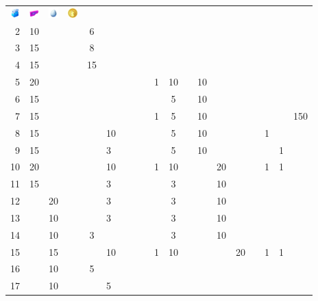 \begin{table}[t]
\begin{center}
\begin{tabular}{r g c g c g c g c g c g c g c g c g c}
  \includegraphics[width=1em]{images/Max_Potion.png} &
  \includegraphics[width=1em]{images/lure.png} &
  \includegraphics[width=1em]{images/luckyegg.png} &
  \includegraphics[width=1em]{images/pokecoin.png}
    \\
    2 & 10 &    &    &  6 &    & & & &   &    &    &    &    &    &   &   &   & \\
    3 & 15 &    &    &  8 &    & & & &   &    &    &    &    &    &   &   &   & \\
    4 & 15 &    &    & 15 &    & & & &   &    &    &    &    &    &   &   &   & \\
    5 & 20 &    &    &    &    & & & & 1 & 10 &    & 10 &    &    &   &   &   & \\
    6 & 15 &    &    &    &    & & & &   &  5 &    & 10 &    &    &   &   &   & \\
    7 & 15 &    &    &    &    & & & & 1 &  5 &    & 10 &    &    &   &   &   & 150 \\
    8 & 15 &    &    &    & 10 & & & &   &  5 &    & 10 &    &    &   & 1 &   & \\
    9 & 15 &    &    &    &  3 & & & &   &  5 &    & 10 &    &    &   &   & 1 & \\
   10 & 20 &    &    &    & 10 & & & & 1 & 10 &    &    & 20 &    &   & 1 & 1 & \\
   11 & 15 &    &    &    &  3 & & & &   &  3 &    &    & 10 &    &   &   &   & \\
   12 &    & 20 &    &    &  3 & & & &   &  3 &    &    & 10 &    &   &   &   & \\
   13 &    & 10 &    &    &  3 & & & &   &  3 &    &    & 10 &    &   &   &   & \\
   14 &    & 10 &    &  3 &    & & & &   &  3 &    &    & 10 &    &   &   &   & \\
   15 &    & 15 &    &    & 10 & & & & 1 & 10 &    &    &    & 20 &   & 1 & 1 & \\
   16 &    & 10 &    &  5 &    & & & &   &    &    &    &    &    &   &   &   & \\
   17 &    & 10 &    &    &  5 & & & &   &    &    &    &    &    &   &   &   & \\

\end{tabular}
\end{center}
\end{table}
